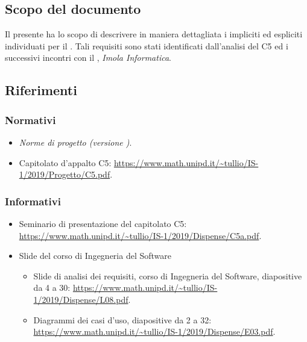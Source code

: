 \documentclass[../analisi-dei-requisiti.tex]{subfiles}
\begin{document}
\subsection{Scopo del documento}%
\label{sub:scopo_del_documento}
Il presente  ha lo scopo di descrivere in maniera dettagliata i  impliciti ed espliciti individuati per il .
Tali requisiti sono stati identificati dall'analisi del  C5 ed i successivi incontri con il , \textit{Imola Informatica}.

\scopoDelProdottoEGlossario{}

\subsection{Riferimenti}%
\label{sub:riferimenti}
\subsubsection{Normativi}%
\label{par:normativi}
\begin{itemize}
  \item \textit{Norme di progetto (versione \versione)}.
  \item Capitolato d'appalto C5: \href{https://www.math.unipd.it/~tullio/IS-1/2019/Progetto/C5.pdf}{https://www.math.unipd.it/\textasciitilde tullio/IS-1/2019/Progetto/C5.pdf}.
\end{itemize}

\subsubsection{Informativi}%
\label{par:informativi}
\begin{itemize}
  \item Seminario di presentazione del capitolato C5: \href{https://www.math.unipd.it/~tullio/IS-1/2019/Dispense/C5a.pdf}{https://www.math.unipd.it/\textasciitilde tullio/IS-1/2019/Dispense/C5a.pdf}.
  \item Slide del corso di Ingegneria del Software
        \begin{itemize}
          \item Slide di analisi dei requisiti, corso di Ingegneria del Software, diapositive da 4 a 30: \href{https://www.math.unipd.it/~tullio/IS-1/2019/Dispense/L08.pdf}{https://www.math.unipd.it/\textasciitilde tullio/IS-1/2019/Dispense/L08.pdf}.
          \item Diagrammi dei casi d'uso, diapositive da 2 a 32: \href{https://www.math.unipd.it/~tullio/IS-1/2019/Dispense/E03.pdf}{https://www.math.unipd.it/\textasciitilde tullio/IS-1/2019/Dispense/E03.pdf}.
        \end{itemize}
\end{itemize}
\end{document}
